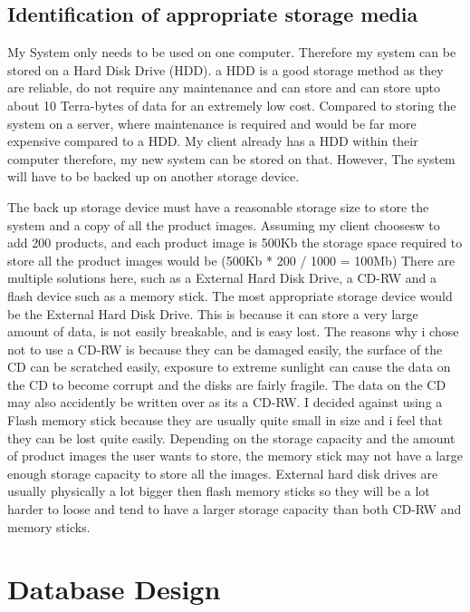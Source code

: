\begin{python}
\subsection{Identification of appropriate storage media}

My System only needs to be used on one computer. Therefore my system can be stored on a Hard Disk Drive (HDD). a HDD is a good storage method as they are reliable, do not require any maintenance and can store and can store upto about 10 Terra-bytes of data for an extremely low cost. Compared to storing the system on a server, where maintenance is required and would be far more expensive compared to a HDD. My client already has a HDD within their computer therefore, my new system can be stored on that. However, The system will have to be backed up on another storage device. \par

The back up storage device must have a reasonable storage size to store the system and a copy of all the product images. Assuming my client choosesw to add 200 products, and each product image is 500Kb the storage space required to store all the product images would be (500Kb * 200 / 1000 = 100Mb) There are multiple solutions here, such as a External Hard Disk Drive, a CD-RW and a flash device such as a memory stick.  The most appropriate storage device would be the External Hard Disk Drive. This is because it can store a very large amount of data, is not easily breakable, and is easy lost. The reasons why i chose not to use a CD-RW is because they can be damaged easily, the surface of the CD can be scratched easily, exposure to extreme sunlight can cause the data on the CD to become corrupt and the disks are fairly fragile. The data on the CD may also accidently be written over as its a CD-RW. I decided against using a Flash memory stick because they are usually quite small in size and i feel that they can be lost quite easily. Depending on the storage capacity and the amount of product images the user wants to store, the memory stick may not have a large enough storage capacity to store all the images. External hard disk drives are usually physically a lot bigger then flash memory sticks so they will be a lot harder to loose and tend to have a larger storage capacity than both CD-RW and memory sticks.\par

\section{Database Design}


\end{python}
